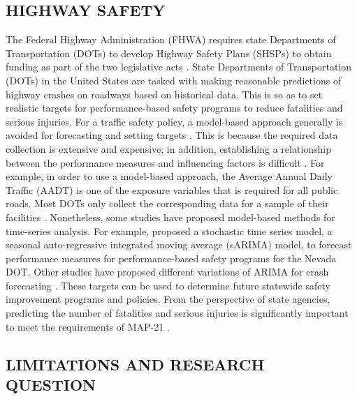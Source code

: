 \documentclass[letterpaper]{article}
\begin{document}
\subsection{HIGHWAY SAFETY}\label{highway-crash-safety}

The Federal Highway Administration (FHWA) requires state Departments of Transportation (DOTs) to develop Highway Safety Plans (SHSPs) to obtain funding as part of the two legislative acts \citep{smith2016hsip}. State Departments of Transportation (DOTs) in the United States are tasked with making reasonable predictions of highway crashes on roadways based on historical data. This is so as to set realistic targets for performance-based safety programs to reduce fatalities and serious injuries. For a traffic safety policy, a model-based approach generally is avoided for forecasting and setting targets \citep{veeramisti2016business}. This is because the required data collection is extensive and expensive; in addition, establishing a relationship between the performance measures and influencing factors is difficult \citep{kweon2012appropriate}. For example, in order to use a model-based approach, the Average Annual Daily Traffic (AADT) is one of the exposure variables that is required for all public roads. Most DOTs only collect the corresponding data for a sample of their facilities \citep{veeramisti2016business}. Nonetheless, some studies have proposed model-based methods for time-series analysis. For example, \cite{veeramisti2016business} proposed a stochastic time series model, a seasonal auto-regressive integrated moving average (sARIMA) model, to forecast performance measures for performance-based safety programs for the Nevada DOT. Other studies have proposed different variations of ARIMA for crash forecasting \citep{yannis2011modeling,sukhai2011temporal}. These targets can be used to determine future statewide safety improvement programs and policies. From the perspective of state agencies, predicting the number of fatalities and serious injuries is significantly important to meet the requirements of MAP-21 \citep{smith2016hsip}.

\subsection{LIMITATIONS AND RESEARCH QUESTION}\label{limitations-and-research-questions}
\end{document}
